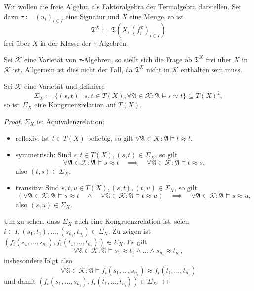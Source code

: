 \begin{remark}
    Wir wollen die freie Algebra als Faktoralgebra der Termalgebra darstellen. Sei dazu $\tau := (n_i)_{i \in I}$ eine Signatur und $X$ eine Menge, so ist
    $$ \mathfrak{T}^X := \mathfrak{T}(X, (f_i^\mathfrak{T})_{i \in I}) $$
    frei über $X$ in der Klasse der $\tau$-Algebren.

    Sei $\mathcal{K}$ eine Varietät von $\tau$-Algebren, so stellt sich die Frage ob $\mathfrak{T}^X$ frei über $X$ in $\mathcal{K}$ ist. Allgemein ist dies nicht der Fall, da $\mathfrak{T}^X$ nicht in $\mathcal{K}$ enthalten sein muss.
\end{remark}

\begin{proposition}
    Sei $\mathcal{K}$ eine Varietät und definiere
    $$ \Sigma_X := \{ (s, t) \mid s, t \in T(X), \forall \mathfrak{A} \in \mathcal{K}: \mathfrak{A} \models s \approx t \} \subseteq T(X)^2, $$
    so ist $\Sigma_X$ eine Kongruenzrelation auf $T(X)$.
\end{proposition}

\begin{proof}
    $\Sigma_X$ ist Äquivalenzrelation:
    \begin{itemize}
        \item reflexiv: Ist $t \in T(X)$ beliebig, so gilt $\forall \mathfrak{A} \in \mathcal{K}: \mathfrak{A} \models t \approx t$.
        \item symmetrisch: Sind $s, t \in T(X), (s,t) \in \Sigma_X$, so gilt
        $$ \forall \mathfrak{A} \in \mathcal{K}: \mathfrak{A} \models s \approx t \quad \implies \quad \forall \mathfrak{A} \in \mathcal{K}: \mathfrak{A} \models t \approx s, $$
        also $(t,s) \in \Sigma_X$.
        \item transitiv: Sind $s,t,u \in T(X), (s,t), (t,u) \in \Sigma_X$, so gilt
        $$ (\forall \mathfrak{A} \in \mathcal{K}: \mathfrak{A} \models s \approx t \quad \land \quad \forall \mathfrak{A} \in \mathcal{K}: \mathfrak{A} \models t \approx u) \quad \implies \quad \forall \mathfrak{A} \in \mathcal{K}: \mathfrak{A} \models s \approx u, $$
        also $(s,u) \in \Sigma_X$.
    \end{itemize}
    Um zu sehen, dass $\Sigma_X$ auch eine Kongruenzrelation ist, seien $i \in I, (s_1, t_1), ..., (s_{n_i}, t_{n_i}) \in \Sigma_X$. Zu zeigen ist $(f_i(s_1, ..., s_{n_i}), f_i(t_1, ..., t_{n_i})) \in \Sigma_X$. Es gilt
    $$ \forall \mathfrak{A} \in \mathcal{K}: \mathfrak{A} \models s_1 \approx t_1 \land ... \land s_{n_i} \approx t_{n_i}, $$
    insbesondere folgt also
    $$ \forall \mathfrak{A} \in \mathcal{K}: \mathfrak{A} \models f_i(s_1, ..., s_{n_i}) \approx f_i(t_1, ..., t_{n_i}) $$
    und damit $(f_i(s_1, ..., s_{n_i}), f_i(t_1, ..., t_{n_i})) \in \Sigma_X$.
\end{proof}


